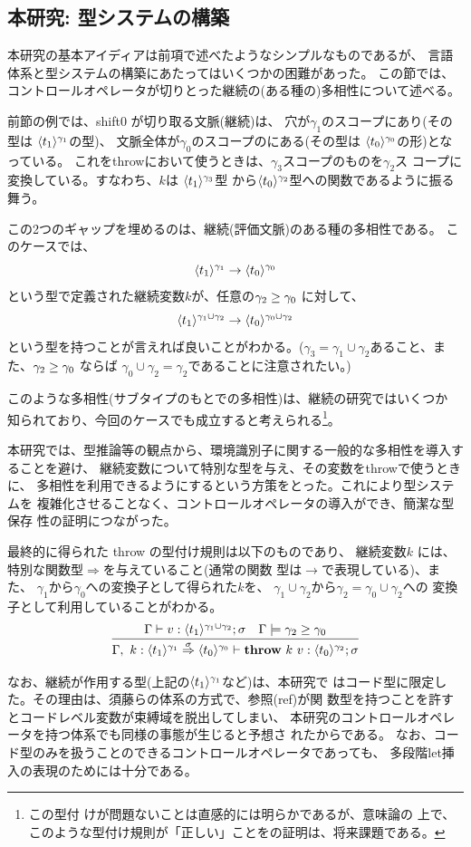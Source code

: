 \subsection{本研究: 型システムの構築}

本研究の基本アイディアは前項で述べたようなシンプルなものであるが、
言語体系と型システムの構築にあたってはいくつかの困難があった。
この節では、コントロールオペレータが切りとった継続の(ある種の)多相性について述べる。

前節の例では、shift0 が切り取る文脈(継続)は、
穴が$\gamma_1$のスコープにあり(その型は $\langle{t_1}\rangle^{\gamma_1}$の型)、
文脈全体が$\gamma_0$のスコープのにある(その型は
$\langle{t_0}\rangle^{\gamma_0}$の形)となっている。
これをthrowにおいて使うときは、$\gamma_3$スコープのものを$\gamma_2$ス
コープに変換している。すなわち、$k$は $\langle{t_1}\rangle^{\gamma_3}$型
から$\langle{t_0}\rangle^{\gamma_2}$型への関数であるように振る舞う。

この2つのギャップを埋めるのは、継続(評価文脈)のある種の多相性である。
このケースでは、
\[\langle{t_1}\rangle^{\gamma_1} \to \langle{t_0}\rangle^{\gamma_0} \]
という型で定義された継続変数$k$が、任意の$\gamma_2 \ge \gamma_0$ に対して、
\[\langle{t_1}\rangle^{\gamma_1 \cup \gamma_2} \to \langle{t_0}\rangle^{\gamma_0 \cup \gamma_2} \]
という型を持つことが言えれば良いことがわかる。($\gamma_3 = \gamma_1
\cup \gamma_2$あること、また、$\gamma_2 \ge \gamma_0$ ならば
$\gamma_0 \cup \gamma_2 = \gamma_2$であることに注意されたい。)

このような多相性(サブタイプのもとでの多相性)は、継続の研究ではいくつか
知られており、今回のケースでも成立すると考えられる\footnote{この型付
けが問題ないことは直感的には明らかであるが、意味論の
上で、このような型付け規則が「正しい」ことをの証明は、将来課題である。}。

本研究では、型推論等の観点から、環境識別子に関する一般的な多相性を導入することを避け、
継続変数について特別な型を与え、その変数をthrowで使うときに、
多相性を利用できるようにするという方策をとった。これにより型システムを
複雑化させることなく、コントロールオペレータの導入ができ、簡潔な型保存
性の証明につながった。

最終的に得られた throw の型付け規則は以下のものであり、
継続変数$k$ には、特別な関数型$\Rightarrow$を与えていること(通常の関数
型は$\rightarrow$で表現している)、また、
$\gamma_1$から$\gamma_0$への変換子として得られた$k$を、
$\gamma_1\cup \gamma_2$から$\gamma_2 = \gamma_0 \cup \gamma_2$への
変換子として利用していることがわかる。
\[
  \infer
  {\Gamma,~k:\contT{\codeT{t_1}{\gamma_1}}{\codeT{t_0}{\gamma_0}}{\sigma}
    \vdash \throw{k}{v} : \codeT{t_0}{\gamma_2} ; \sigma}
  {\Gamma
    \vdash v : \codeT{t_1}{\gamma_1 \cup \gamma_2} ; \sigma
    & \Gamma \models \gamma_2 \ord \gamma_0
  }
\]

なお、継続が作用する型(上記の$\langle{t_1}\rangle^{\gamma_1}$など)は、本研究で
はコード型に限定した。その理由は、須藤らの体系の方式で、参照(ref)が関
数型を持つことを許すとコードレベル変数が束縛域を脱出してしまい、
本研究のコントロールオペレータを持つ体系でも同様の事態が生じると予想さ
れたからである。
なお、コード型のみを扱うことのできるコントロールオペレータであっても、
多段階let挿入の表現のためには十分である。

